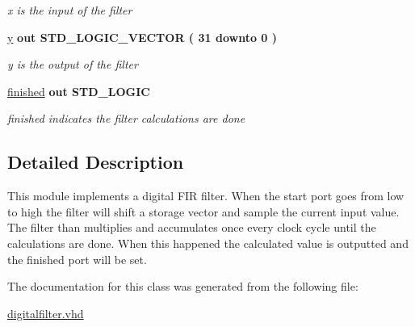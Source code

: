 \begin{DoxyCompactItemize}
\begin{DoxyCompactList}\small\item\em x is the input of the filter \end{DoxyCompactList}\item 
\hypertarget{classdigitalfilter_af668726c6bb16ef4d276739c4c161217}{\hyperlink{classdigitalfilter_af668726c6bb16ef4d276739c4c161217}{y}  {\bfseries {\bfseries \textcolor{vhdlkeyword}{out}\textcolor{vhdlchar}{ }}} {\bfseries \textcolor{comment}{S\-T\-D\-\_\-\-L\-O\-G\-I\-C\-\_\-\-V\-E\-C\-T\-O\-R}\textcolor{vhdlchar}{ }\textcolor{vhdlchar}{(}\textcolor{vhdlchar}{ }\textcolor{vhdlchar}{ } \textcolor{vhdldigit}{31} \textcolor{vhdlchar}{ }\textcolor{vhdlchar}{ }\textcolor{vhdlchar}{ }\textcolor{vhdlkeyword}{downto}\textcolor{vhdlchar}{ }\textcolor{vhdlchar}{ }\textcolor{vhdlchar}{ } \textcolor{vhdldigit}{0} \textcolor{vhdlchar}{ }\textcolor{vhdlchar}{)}\textcolor{vhdlchar}{ }} }\label{classdigitalfilter_af668726c6bb16ef4d276739c4c161217}

\begin{DoxyCompactList}\small\item\em y is the output of the filter \end{DoxyCompactList}\item 
\hypertarget{classdigitalfilter_ad2b5eab2bb63ad6b267ff2523ac34898}{\hyperlink{classdigitalfilter_ad2b5eab2bb63ad6b267ff2523ac34898}{finished}  {\bfseries {\bfseries \textcolor{vhdlkeyword}{out}\textcolor{vhdlchar}{ }}} {\bfseries \textcolor{comment}{S\-T\-D\-\_\-\-L\-O\-G\-I\-C}\textcolor{vhdlchar}{ }} }\label{classdigitalfilter_ad2b5eab2bb63ad6b267ff2523ac34898}

\begin{DoxyCompactList}\small\item\em finished indicates the filter calculations are done \end{DoxyCompactList}\end{DoxyCompactItemize}


\subsection{Detailed Description}
This module implements a digital F\-I\-R filter. When the start port goes from low to high the filter will shift a storage vector and sample the current input value. The filter than multiplies and accumulates once every clock cycle until the calculations are done. When this happened the calculated value is outputted and the finished port will be set. 

The documentation for this class was generated from the following file\-:\begin{DoxyCompactItemize}
\item 
\hyperlink{digitalfilter_8vhd}{digitalfilter.\-vhd}\end{DoxyCompactItemize}
